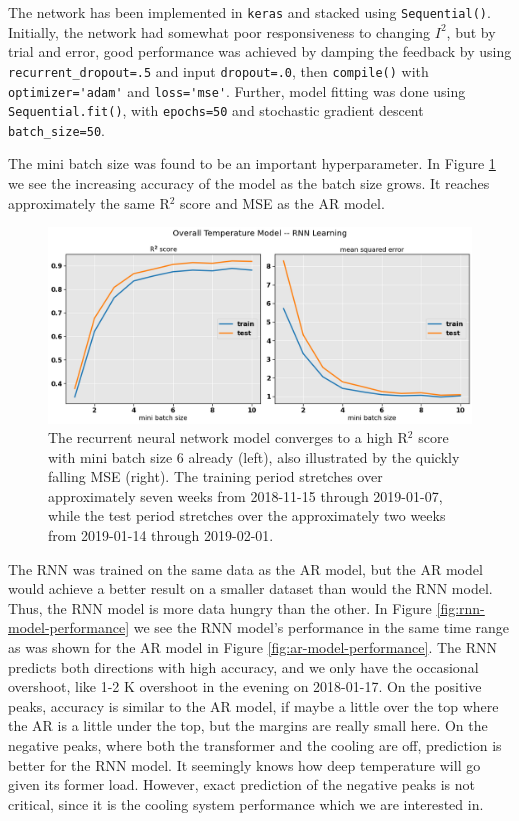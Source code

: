 \documentclass[]{article}
\begin{document}
The network has been implemented in \lstinline|keras| and stacked using \lstinline|Sequential()|. Initially, the network had somewhat poor responsiveness to changing $I^2$, but by trial and error, good performance was achieved by damping the feedback by using \lstinline|recurrent_dropout=.5| and input \lstinline|dropout=.0|, then \lstinline|compile()| with \lstinline|optimizer='adam'| and \lstinline|loss='mse'|. Further, model fitting was done using \lstinline|Sequential.fit()|, with \lstinline|epochs=50| and stochastic gradient descent \lstinline|batch_size=50|.

The mini batch size was found to be an important hyperparameter. In Figure \ref{fig:rnn-model-learning} we see the increasing accuracy of the model as the batch size grows. It reaches approximately the same R$^2$ score and MSE as the AR model. 

\begin{figure}[!h]
	\centering
	\includegraphics[width=1\linewidth]{./figs/rnn-model-learning.png}
	\caption{The recurrent neural network model converges to a high R$^2$ score with mini batch size 6 already (left), also illustrated by the quickly falling MSE (right). The training period stretches over approximately seven weeks from 2018-11-15 through 2019-01-07, while the test period stretches over the approximately two weeks from 2019-01-14 through 2019-02-01.}
	\label{fig:rnn-model-learning}
\end{figure}

The RNN was trained on the same data as the AR model, but the AR model would achieve a better result on a smaller dataset than would the RNN model. Thus, the RNN model is more data hungry than the other. In Figure \ref{fig:rnn-model-performance} we see the RNN model's performance in the same time range as was shown for the AR model in Figure \ref{fig:ar-model-performance}. The RNN predicts both directions with high accuracy, and we only have the occasional overshoot, like 1-2 K overshoot in the evening on 2018-01-17. On the positive peaks, accuracy is similar to the AR model, if maybe a little over the top where the AR is a little under the top, but the margins are really small here. On the negative peaks, where both the transformer and the cooling are off, prediction is better for the RNN model. It seemingly knows how deep temperature will go given its former load. However, exact prediction of the negative peaks is not critical, since it is the cooling system performance which we are interested in.
\end{document}
